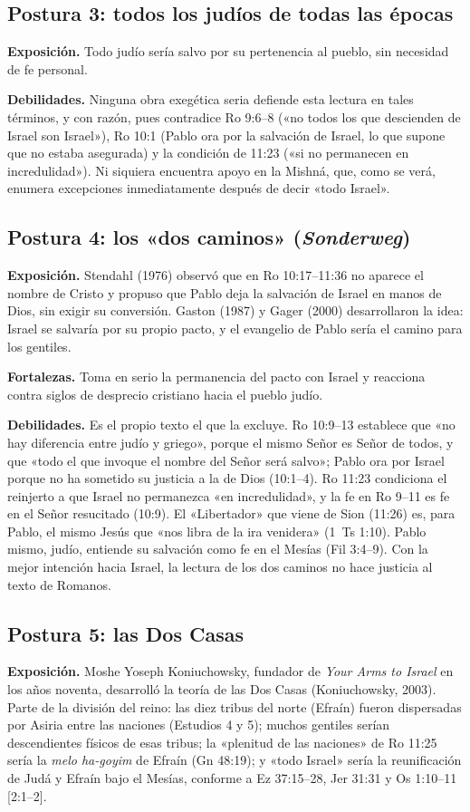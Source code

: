 \subsection{Postura 3: todos los judíos de todas las épocas}
\textbf{Exposición.} Todo judío sería salvo por su pertenencia al pueblo, sin necesidad de fe personal.

\textbf{Debilidades.} Ninguna obra exegética seria defiende esta lectura en tales términos, y con razón, pues contradice Ro 9:6--8 («no todos los que descienden de Israel son Israel»), Ro 10:1 (Pablo ora por la salvación de Israel, lo que supone que no estaba asegurada) y la condición de 11:23 («si no permanecen en incredulidad»). Ni siquiera encuentra apoyo en la Mishná, que, como se verá, enumera excepciones inmediatamente después de decir «todo Israel».

\subsection{Postura 4: los «dos caminos» (\emph{Sonderweg})}
\textbf{Exposición.} Stendahl (1976) observó que en Ro 10:17--11:36 no aparece el nombre de Cristo y propuso que Pablo deja la salvación de Israel en manos de Dios, sin exigir su conversión. Gaston (1987) y Gager (2000) desarrollaron la idea: Israel se salvaría por su propio pacto, y el evangelio de Pablo sería el camino para los gentiles.

\textbf{Fortalezas.} Toma en serio la permanencia del pacto con Israel y reacciona contra siglos de desprecio cristiano hacia el pueblo judío.

\textbf{Debilidades.} Es el propio texto el que la excluye. Ro 10:9--13 establece que «no hay diferencia entre judío y griego», porque el mismo Señor es Señor de todos, y que «todo el que invoque el nombre del Señor será salvo»; Pablo ora por Israel porque no ha sometido su justicia a la de Dios (10:1--4). Ro 11:23 condiciona el reinjerto a que Israel no permanezca «en incredulidad», y la fe en Ro 9--11 es fe en el Señor resucitado (10:9). El «Libertador» que viene de Sion (11:26) es, para Pablo, el mismo Jesús que «nos libra de la ira venidera» (1~Ts 1:10). Pablo mismo, judío, entiende su salvación como fe en el Mesías (Fil 3:4--9). Con la mejor intención hacia Israel, la lectura de los dos caminos no hace justicia al texto de Romanos.

\subsection{Postura 5: las Dos Casas}
\textbf{Exposición.} Moshe Yoseph Koniuchowsky, fundador de \emph{Your Arms to Israel} en los años noventa, desarrolló la teoría de las Dos Casas (Koniuchowsky, 2003). Parte de la división del reino: las diez tribus del norte (Efraín) fueron dispersadas por Asiria entre las naciones (Estudios 4 y 5); muchos gentiles serían descendientes físicos de esas tribus; la «plenitud de las naciones» de Ro 11:25 sería la \emph{melo ha-goyim} de Efraín (Gn 48:19); y «todo Israel» sería la reunificación de Judá y Efraín bajo el Mesías, conforme a Ez 37:15--28, Jer 31:31 y Os 1:10--11 [2:1--2].

